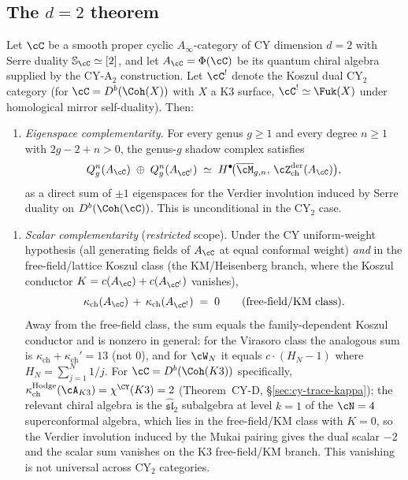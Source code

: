 \subsection{The \texorpdfstring{$d = 2$}{d = 2} theorem}

\begin{theorem}[CY complementarity at \texorpdfstring{$d = 2$}{d = 2}]
\label{thm:cy-complementarity-d2}
Let $\cC$ be a smooth proper cyclic $A_\infty$-category of CY dimension $d = 2$ with Serre duality $\mathbb{S}_\cC \simeq [2]$, and let $A_\cC = \Phi(\cC)$ be its quantum chiral algebra supplied by the CY-A$_2$ construction. Let $\cC^!$ denote the Koszul dual CY$_2$ category (for $\cC = D^b(\Coh(X))$ with $X$ a K3 surface, $\cC^! \simeq \Fuk(X)$ under homological mirror self-duality). Then:
\begin{enumerate}[label=\textup{(C1$^{\mathrm{CY}}$)}]
 \item \emph{Eigenspace complementarity.} For every genus $g \geq 1$ and every degree $n \geq 1$ with $2g - 2 + n > 0$, the genus-$g$ shadow complex satisfies
 \[
 Q_g^n(A_\cC) \;\oplus\; Q_g^n(A_{\cC^!})
 \;\simeq\; H^\bullet\!\bigl(\overline{\cM}_{g,n},\, \cZ^{\mathrm{der}}_{\mathrm{ch}}(A_\cC)\bigr),
 \]
 as a direct sum of $\pm 1$ eigenspaces for the Verdier involution induced by Serre duality on $D^b(\Coh(\cC))$. This is unconditional in the CY$_2$ case.
\end{enumerate}
\begin{enumerate}[label=\textup{(C$_{\mathrm{scal}}^{\mathrm{CY}}$)}]
 \item \emph{Scalar complementarity} (\emph{restricted} scope). Under the CY uniform-weight hypothesis (all generating fields of $A_\cC$ at equal conformal weight) \emph{and} in the free-field/lattice Koszul class (the KM/Heisenberg branch, where the Koszul conductor $K = c(A_\cC) + c(A_{\cC^!})$ vanishes),
 \[
 \kappa_{\mathrm{ch}}(A_\cC) \,+\, \kappa_{\mathrm{ch}}(A_{\cC^!}) \;=\; 0 \qquad \text{(free-field/KM class)}.
 \]
 Away from the free-field class, the sum equals the family-dependent Koszul conductor and is nonzero in general: for the Virasoro class the analogous sum is $\kappa_{\mathrm{ch}} + \kappa_{\mathrm{ch}}' = 13$ (not $0$), and for $\cW_N$ it equals $c \cdot (H_N - 1)$ where $H_N = \sum_{j=1}^{N} 1/j$. For $\cC = D^b(\Coh(K3))$ specifically, $\kappa_{\mathrm{ch}}^{\mathrm{Hodge}}(\cA_{K3}) = \chi^{\CY}(K3) = 2$ (Theorem~CY-D, \S\ref{sec:cy-trace-kappa}); the relevant chiral algebra is the $\widehat{\mathfrak{sl}}_2$ subalgebra at level $k = 1$ of the $\cN = 4$ superconformal algebra, which lies in the free-field/KM class with $K = 0$, so the Verdier involution induced by the Mukai pairing gives the dual scalar \(-2\) and the scalar sum vanishes on the K3 free-field/KM branch. This vanishing is not universal across CY$_2$ categories.
\end{enumerate}
\end{theorem}


